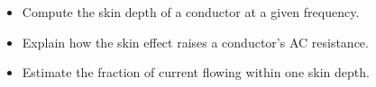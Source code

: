 \begin{objectives}
\begin{itemize}[leftmargin=1.4em,itemsep=2pt]
\item Compute the skin depth of a conductor at a given frequency.
\item Explain how the skin effect raises a conductor's AC resistance.
\item Estimate the fraction of current flowing within one skin depth.
\end{itemize}
\end{objectives}
